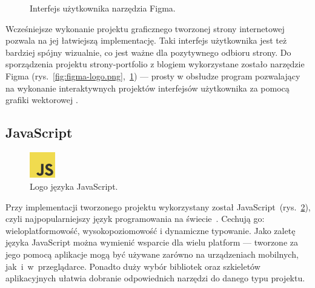 \documentclass[a4paper, 12pt, twoside]{article}
\numberwithin{figure}{section}
\begin{document}
\begin{sloppypar}
\begin{figure}[H] 
    \centering
   \caption{Interfejs użytkownika narzędzia Figma.}
   \label{fig:figma-1.jpg}
\end{figure}

Wcześniejsze wykonanie projektu graficznego tworzonej strony internetowej pozwala na jej łatwiejszą implementację. Taki interfejs użytkownika jest też bardziej spójny wizualnie, co jest ważne dla pozytywnego odbioru strony. Do sporządzenia projektu strony-portfolio z blogiem wykorzystane zostało narzędzie Figma (rys.~\ref{fig:figma-logo.png},~\ref{fig:figma-1.jpg}) --- prosty w obsłudze program pozwalający na wykonanie interaktywnych projektów interfejsów użytkownika za pomocą grafiki wektorowej \cite{figma}. 


\subsection*{JavaScript}

\begin{figure}[H] 
    \centering
        \includegraphics[width=0.1\textwidth]{images/js-logo.png}
   \caption{Logo języka JavaScript.}
   \label{fig:js-logo.png}
\end{figure}

Przy implementacji tworzonego projektu wykorzystany został JavaScript~(rys.~\ref{fig:js-logo.png}), czyli najpopularniejszy język programowania na świecie~\cite{js}. Cechują go: wieloplatformowość, wysokopoziomowość i dynamiczne typowanie. Jako zaletę języka JavaScript można wymienić wsparcie dla wielu platform --- tworzone za jego pomocą aplikacje mogą być używane zarówno na urządzeniach mobilnych, jak~i~w~przeglądarce. Ponadto duży wybór bibliotek oraz szkieletów aplikacyjnych ułatwia dobranie odpowiednich narzędzi do danego typu projektu.


\end{sloppypar}
\end{document}
